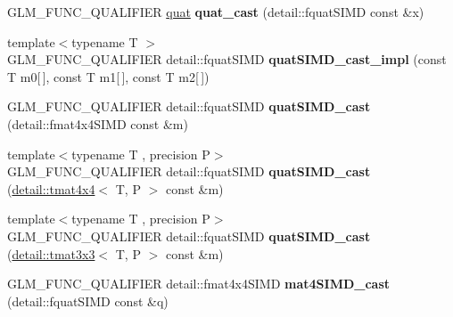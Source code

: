 \begin{DoxyCompactItemize}
\item 
G\+L\+M\+\_\+\+F\+U\+N\+C\+\_\+\+Q\+U\+A\+L\+I\+F\+I\+ER \hyperlink{namespaceglm_ac1f6a5957091b849730ea6f05a6b7ad6}{quat} {\bfseries quat\+\_\+cast} (detail\+::fquat\+S\+I\+MD const \&x)\hypertarget{namespaceglm_a68af15a87ea3aac558767c9bb2ed141d}{}\label{namespaceglm_a68af15a87ea3aac558767c9bb2ed141d}

\item 
{\footnotesize template$<$typename T $>$ }\\G\+L\+M\+\_\+\+F\+U\+N\+C\+\_\+\+Q\+U\+A\+L\+I\+F\+I\+ER detail\+::fquat\+S\+I\+MD {\bfseries quat\+S\+I\+M\+D\+\_\+cast\+\_\+impl} (const T m0\mbox{[}$\,$\mbox{]}, const T m1\mbox{[}$\,$\mbox{]}, const T m2\mbox{[}$\,$\mbox{]})\hypertarget{namespaceglm_a2e2bb4244525831b56079cdacc87948d}{}\label{namespaceglm_a2e2bb4244525831b56079cdacc87948d}

\item 
G\+L\+M\+\_\+\+F\+U\+N\+C\+\_\+\+Q\+U\+A\+L\+I\+F\+I\+ER detail\+::fquat\+S\+I\+MD {\bfseries quat\+S\+I\+M\+D\+\_\+cast} (detail\+::fmat4x4\+S\+I\+MD const \&m)\hypertarget{namespaceglm_a0c09f4c773ffd14c3d9246a50011cf0c}{}\label{namespaceglm_a0c09f4c773ffd14c3d9246a50011cf0c}

\item 
{\footnotesize template$<$typename T , precision P$>$ }\\G\+L\+M\+\_\+\+F\+U\+N\+C\+\_\+\+Q\+U\+A\+L\+I\+F\+I\+ER detail\+::fquat\+S\+I\+MD {\bfseries quat\+S\+I\+M\+D\+\_\+cast} (\hyperlink{structglm_1_1detail_1_1tmat4x4}{detail\+::tmat4x4}$<$ T, P $>$ const \&m)\hypertarget{namespaceglm_a9f05471745ec80855fe4d6559879ad64}{}\label{namespaceglm_a9f05471745ec80855fe4d6559879ad64}

\item 
{\footnotesize template$<$typename T , precision P$>$ }\\G\+L\+M\+\_\+\+F\+U\+N\+C\+\_\+\+Q\+U\+A\+L\+I\+F\+I\+ER detail\+::fquat\+S\+I\+MD {\bfseries quat\+S\+I\+M\+D\+\_\+cast} (\hyperlink{structglm_1_1detail_1_1tmat3x3}{detail\+::tmat3x3}$<$ T, P $>$ const \&m)\hypertarget{namespaceglm_ac9fd0f70546c3bf30a8aa72691877199}{}\label{namespaceglm_ac9fd0f70546c3bf30a8aa72691877199}

\item 
G\+L\+M\+\_\+\+F\+U\+N\+C\+\_\+\+Q\+U\+A\+L\+I\+F\+I\+ER detail\+::fmat4x4\+S\+I\+MD {\bfseries mat4\+S\+I\+M\+D\+\_\+cast} (detail\+::fquat\+S\+I\+MD const \&q)\hypertarget{namespaceglm_a0b2e5499072a338c1256735ecbf363ff}{}\label{namespaceglm_a0b2e5499072a338c1256735ecbf363ff}


\end{DoxyCompactItemize}
